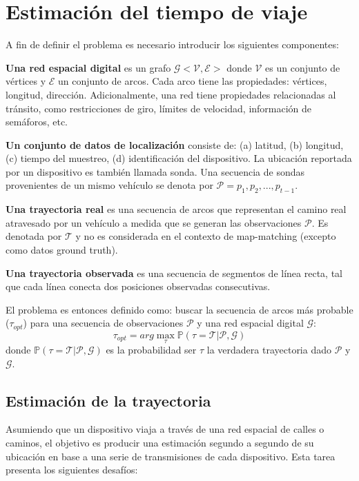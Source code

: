 \let\textcircled=\pgftextcircled
\chapter {Estimación del tiempo de viaje}
\label{chap:estimacion}

A fin de definir el problema es necesario introducir los siguientes componentes:

\textbf{Una red espacial digital} es un grafo \(\mathcal{G <V,E>}\) donde \(\mathcal{V}\) es un conjunto de vértices y \(\mathcal{E}\) un conjunto de arcos. Cada arco tiene las propiedades: vértices, longitud, dirección. Adicionalmente, una red tiene propiedades relacionadas al tránsito, como restricciones de giro, límites de velocidad, información de semáforos, etc.

\textbf{Un conjunto de datos de localización} consiste de: (a) latitud, (b) longitud, (c) tiempo del muestreo, (d) identificación del dispositivo. La ubicación  reportada por un dispositivo es también llamada sonda. Una secuencia de sondas provenientes de un mismo vehículo se denota por \(\mathcal{P} = p_1,p_2,...,p_{t-1}\).

\textbf{Una trayectoria real} es una secuencia de arcos que representan el camino real atravesado por un vehículo a medida que se generan las observaciones \(\mathcal{P}\). Es denotada por \(\mathcal{T}\) y no es considerada en el contexto de map-matching (excepto como datos ground truth).

\textbf{Una trayectoria observada} es una secuencia de segmentos de línea recta, tal que cada línea conecta dos posiciones observadas consecutivas.

El problema es entonces definido como: buscar la secuencia de arcos más probable ($\tau_{opt}$) para una secuencia de observaciones \(\mathcal{P}\) y una red espacial digital  \(\mathcal{G}\):
\[\tau_{opt} = arg \max_{\tau} \mathbb{P}(\tau = \mathcal{T|P,G})\] 
donde \( \mathbb{P}(\tau = \mathcal{T|P,G})\) es la probabilidad ser $\tau$ la verdadera trayectoria dado \(\mathcal{P}\) y \(\mathcal{G}\).

\section{Estimación de la trayectoria}
Asumiendo que un dispositivo viaja a través de una red espacial de calles o caminos, el objetivo es producir una estimación segundo a segundo de su ubicación en base a una serie de transmisiones de cada dispositivo. Esta tarea presenta los siguientes desafíos: 

